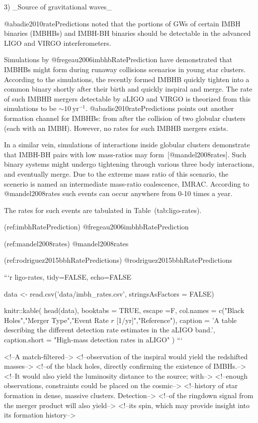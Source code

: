 {{{{{{{{{{{{{{3) _Source of gravitational waves_

    @abadie2010ratePredictions noted that the portions of GWs of certain
    IMBH binaries (IMBHBs) and IMBH-BH binaries should be detectable in
    the advanced LIGO and VIRGO interferometers.

    Simulations by @fregeau2006imbhbRatePrediction have demonstrated
    that IMBHBs might form during runaway collisions scenarios in young
    star clusters. According to the simulations, the recently formed
    IMBHB quickly tighten into a common binary shortly after their birth
    and quickly inspiral and merge. The rate of such IMBHB mergers
    detectable by aLIGO and VIRGO is theorized from this simulations to
    be $\sim10\ \text{yr}^{-1}$. @abadie2010ratePredictions points
    out another formation channel for IMBHBs: from after the
    collision of two globular clusters (each with an IMBH). However,
    no rates for such IMBHB mergers exists.

    In a similar vein, simulations of interactions inside globular
    clusters demonstrate that IMBH-BH pairs with low mass-ratios may
    form~[@mandel2008rates]. Such binary systems might undergo
    tightening through various three body interactions, and eventually
    merge. Due to the extreme mass ratio of this scenario, the scenerio
    is named an intermediate mass-ratio coalescence, IMRAC. According to
    @mandel2008rates such events can occur anywhere from 0-10 times a
    year.

The rates for such events are tabulated in Table~\@ref(tab:ligo-rates).


(ref:imbhRatePrediction) @fregeau2006imbhbRatePrediction

(ref:mandel2008rates) @mandel2008rates

(ref:rodriguez2015bbhRatePredictions) @rodriguez2015bbhRatePredictions

```{r ligo-rates, tidy=FALSE, echo=FALSE}

data <- read.csv('data/imbh_rates.csv',  stringsAsFactors = FALSE)

knitr::kable(
  head(data), booktabs = TRUE, escape =F,
  col.names = c("Black Holes","Merger Type","Event Rate $r$ [1/yr]","Reference"),
  caption = 'A table describing the different detection rate estimates in the aLIGO band.',
  caption.short = "High-mass detection rates in aLIGO" 
)
```


<!--A match-filtered-->
<!--observation of the inspiral would yield the redshifted masses-->
<!--of the black holes, directly confirming the existence of IMBHs.-->
<!--It would also yield the luminosity distance to the source; with-->
<!--enough observations, constraints could be placed on the cosmic-->
<!--history of star formation in dense, massive clusters. Detection-->
<!--of the ringdown signal from the merger product will also yield-->
<!--its spin, which may provide insight into its formation history-->



}}}}}}}}}}}}}}
